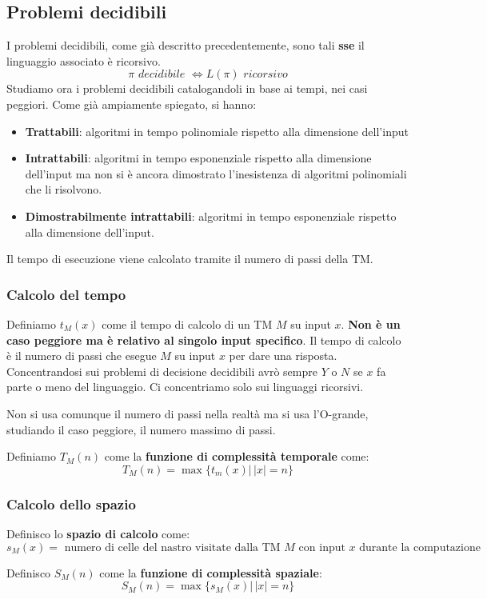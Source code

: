 \subsection{Problemi decidibili}
I problemi decidibili, come già descritto precedentemente, sono tali \textbf{sse} il linguaggio associato è ricorsivo.
\[\pi \,\,decidibile\,\, \iff L(\pi)\,\,ricorsivo\]
Studiamo ora i problemi decidibili catalogandoli in base ai tempi, nei casi
peggiori. Come già ampiamente spiegato, si hanno: 
\begin{itemize}
  \item \textbf{Trattabili}: algoritmi in tempo polinomiale rispetto alla dimensione dell'input
    \item \textbf{Intrattabili}: algoritmi in tempo esponenziale rispetto alla dimensione dell'input ma non si è ancora dimostrato l'inesistenza di algoritmi polinomiali che li risolvono.
  \item \textbf{Dimostrabilmente intrattabili}: algoritmi in tempo esponenziale rispetto alla dimensione dell'input.
\end{itemize}
Il tempo di esecuzione viene calcolato tramite il numero di passi della TM.
\subsubsection{Calcolo del tempo}
\begin{definizione}
  Definiamo $t_M(x)$ come il tempo di calcolo di un TM $M$ su input $x$. \textbf{Non è
  un caso peggiore ma è relativo al singolo input specifico}. Il tempo di
  calcolo è il numero di passi che esegue $M$ su input $x$ per dare una
  risposta. Concentrandosi sui problemi di decisione decidibili avrò sempre $Y$
  o $N$ se $x$ fa parte o meno del linguaggio. Ci concentriamo solo sui
  linguaggi ricorsivi.
\end{definizione}
Non si usa comunque il numero di passi nella realtà ma si usa l'O-grande,
studiando il caso peggiore, il numero massimo di passi.
\begin{definizione}
  Definiamo $T_M(n)$ come la \textbf{funzione di complessità temporale} come:
  \[T_M(n)=\max\{t_m(x)|\,|x|=n\}\]
\end{definizione}
\subsubsection{Calcolo dello spazio}
\begin{definizione}
  Definisco lo \textbf{spazio di calcolo} come:
  \[s_M(x)=\mbox{ numero di celle del nastro visitate dalla TM $M$ con input $x$ durante la computazione}\]
\end{definizione}
\begin{definizione}
  Definisco $S_M(n)$ come la \textbf{funzione di complessità spaziale}:
  \[S_M(n)=\max\{s_M(x)|\,|x|=n\}\]
\end{definizione}
